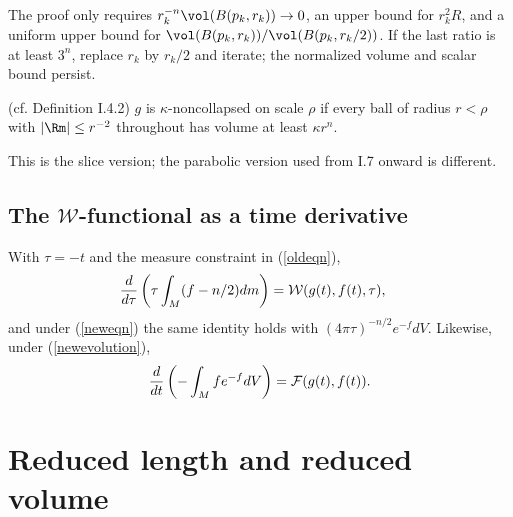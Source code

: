 \begin{remark}
  \label{rem:kl-no-local-collapsing-theorem-i-estimates-scalar-curvature}
The proof only requires $r_k^{-n}\vol(B(p_k,r_k))\to0$, an upper bound for
$r_k^2R$, and a uniform upper bound for
$\vol(B(p_k,r_k))/\vol(B(p_k,r_k/2))$. If the last ratio is at least $3^n$,
replace $r_k$ by $r_k/2$ and iterate; the normalized volume and scalar bound persist.
\end{remark}
\begin{definition}
  \label{def:kl-no-local-collapsing-theorem-i-kappa-noncollapsing}
  \label{noncollapsed1} (cf. Definition I.4.2)
$g$ is $\kappa$-noncollapsed on scale $\rho$ if every ball of radius $r<\rho$
with $|\Rm|\le r^{-2}$ throughout has volume at least $\kappa r^n$.
\end{definition}
\begin{remark}
  \label{rem:kl-no-local-collapsing-theorem-i-structural-remark-noncollapsing}
This is the slice version; the parabolic version used from I.7 onward is different.
\end{remark}

\subsection{The ${\mathcal W}$-functional as a time derivative} \label{I.5}
With $\tau=-t$ and the measure constraint in (\ref{oldeqn}),
\begin{align}
{d\over d\tau}\left(\tau\int_M(f-n/2)dm\right)&={\mathcal W}(g(t),f(t),\tau),
\end{align}
and under (\ref{neweqn}) the same identity holds with
$(4\pi\tau)^{-n/2}e^{-f}dV$. Likewise, under (\ref{newevolution}),
\begin{equation}
{d\over dt}\left(-\int_Mfe^{-f}dV\right)={\mathcal F}(g(t),f(t)).
\end{equation}

\section{Reduced length and reduced volume} \label{I.7}

